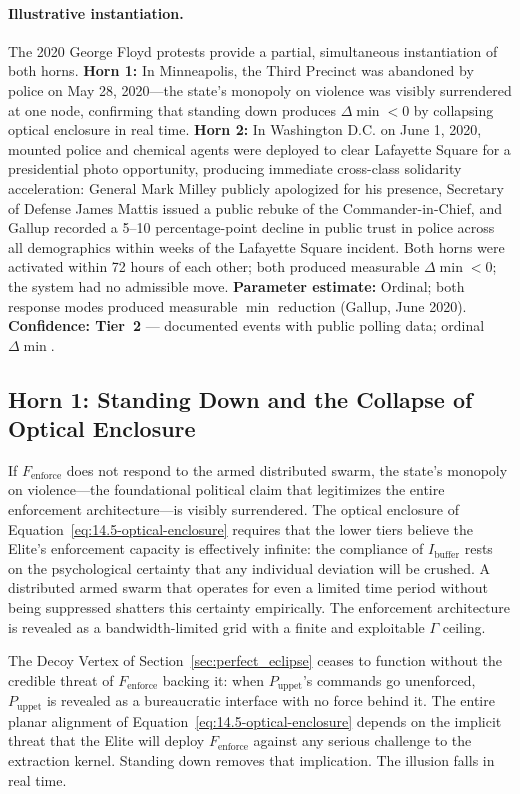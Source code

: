 \paragraph{Illustrative instantiation.}
The 2020 George Floyd protests provide a partial, simultaneous instantiation of both horns. \textbf{Horn 1:} In Minneapolis, the Third Precinct was abandoned by police on May 28, 2020---the state's monopoly on violence was visibly surrendered at one node, confirming that standing down produces $\Delta\min < 0$ by collapsing optical enclosure in real time. \textbf{Horn 2:} In Washington D.C. on June 1, 2020, mounted police and chemical agents were deployed to clear Lafayette Square for a presidential photo opportunity, producing immediate cross-class solidarity acceleration: General Mark Milley publicly apologized for his presence, Secretary of Defense James Mattis issued a public rebuke of the Commander-in-Chief, and Gallup recorded a 5--10 percentage-point decline in public trust in police across all demographics within weeks of the Lafayette Square incident. Both horns were activated within 72 hours of each other; both produced measurable $\Delta\min < 0$; the system had no admissible move. \textbf{Parameter estimate:} Ordinal; both response modes produced measurable $\min$ reduction (Gallup, June 2020). \textbf{Confidence: Tier~2} --- documented events with public polling data; ordinal $\Delta\min$.

\subsection{Horn 1: Standing Down and the Collapse of Optical Enclosure}

If $F_{\text{enforce}}$ does not respond to the armed distributed swarm, the state's monopoly on violence---the foundational political claim that legitimizes the entire enforcement architecture---is visibly surrendered. The optical enclosure of Equation~\eqref{eq:14.5-optical-enclosure} requires that the lower tiers believe the Elite's enforcement capacity is effectively infinite: the compliance of $I_{\text{buffer}}$ rests on the psychological certainty that any individual deviation will be crushed. A distributed armed swarm that operates for even a limited time period without being suppressed shatters this certainty empirically. The enforcement architecture is revealed as a bandwidth-limited grid with a finite and exploitable $\Gamma$ ceiling.

The Decoy Vertex of Section~\ref{sec:perfect_eclipse} ceases to function without the credible threat of $F_{\text{enforce}}$ backing it: when $P_{\text{uppet}}$'s commands go unenforced, $P_{\text{uppet}}$ is revealed as a bureaucratic interface with no force behind it. The entire planar alignment of Equation~\eqref{eq:14.5-optical-enclosure} depends on the implicit threat that the Elite will deploy $F_{\text{enforce}}$ against any serious challenge to the extraction kernel. Standing down removes that implication. The illusion falls in real time.

